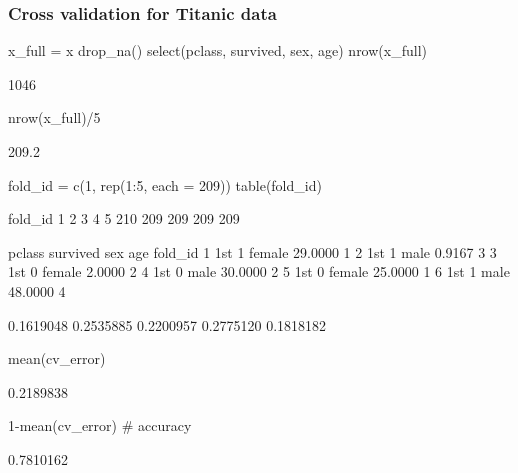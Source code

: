 \documentclass[a4paper]{article}
\begin{document}
\subsubsection{Cross validation for Titanic data}
\begin{Schunk}
\begin{Sinput}
x_full = x %
  drop_na() %
  select(pclass, survived, 
         sex, age)
nrow(x_full)
\end{Sinput}
\begin{Soutput}
[1] 1046
\end{Soutput}
\begin{Sinput}
nrow(x_full)/5
\end{Sinput}
\begin{Soutput}
[1] 209.2
\end{Soutput}
\begin{Sinput}
fold_id = c(1, rep(1:5, each = 209))
table(fold_id)
\end{Sinput}
\begin{Soutput}
fold_id
  1   2   3   4   5 
210 209 209 209 209 
\end{Soutput}
\begin{Soutput}
  pclass survived    sex     age fold_id
1    1st        1 female 29.0000       1
2    1st        1   male  0.9167       3
3    1st        0 female  2.0000       2
4    1st        0   male 30.0000       2
5    1st        0 female 25.0000       1
6    1st        1   male 48.0000       4
\end{Soutput}
\begin{Soutput}
[1] 0.1619048 0.2535885 0.2200957 0.2775120 0.1818182
\end{Soutput}
\begin{Sinput}
mean(cv_error)
\end{Sinput}
\begin{Soutput}
[1] 0.2189838
\end{Soutput}
\begin{Sinput}
1-mean(cv_error) # accuracy
\end{Sinput}
\begin{Soutput}
[1] 0.7810162
\end{Soutput}
\end{Schunk}
\end{document}
